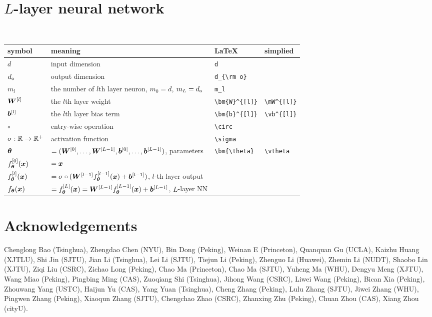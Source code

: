 \documentclass{article}
\begin{document}
\section{$L$-layer neural network}~\\
\begin{center}
    \begin{tabular}{llll}
        \toprule
        symbol & meaning & \LaTeX & simplied\\
        \midrule
        $d$ & input dimension & \verb!d! &  \\
        $d_{\rm o}$ & output dimension &\verb!d_{\rm o}! &  \\
        $m_l$& the number of $l$th layer neuron, $m_0=d$, $m_{L} = d_{\rm o}$&\verb!m_l!\\
        $\bm{W}^{[l]}$ & the $l$th layer weight &\verb!\bm{W}^{[l]}!&\verb!\mW^{[l]}!\\
        $\bm{b}^{[l]}$ & the $l$th layer bias term&\verb!\bm{b}^{[l]}!&\verb!\vb^{[l]}!\\
        $\circ$&entry-wise operation&\verb!\circ!\\
        $\sigma:\mathbb{R}\to\mathbb{R}^+$& activation function &\verb!\sigma!\\
        $\bm{\theta}$&$=(\bm{W}^{[0]},\ldots,\bm{W}^{[L-1]},\bm{b}^{[0]},\ldots,\bm{b}^{[L-1]})$,  parameters&\verb!\bm{\theta}!&\verb!\vtheta!\\
        $f_{\bm{\theta}}^{[0]}(\bm{x})$&$=\bm{x}$\\
        $f_{\bm{\theta}}^{[l]}(\bm{x})$&$=\sigma\circ(\bm{W}^{[l-1]} f_{\bm{\theta}}^{[l-1]}(\bm{x}) + \bm{b}^{[l-1]})$,  $l$-th  layer output \\
         $f_{\bm{\theta}}(\bm{x})$&$=f_{\bm{\theta}}^{[L]}(\bm{x})=\bm{W}^{[L-1]} f_{\bm{\theta}}^{[L-1]}(\bm{x}) + \bm{b}^{[L-1]}$,  $L$-layer NN\\
        \bottomrule
    \end{tabular}
\end{center}

\newpage
\section{Acknowledgements}
Chenglong Bao (Tsinghua), Zhengdao Chen (NYU), Bin Dong (Peking), Weinan E (Princeton),  Quanquan Gu (UCLA), Kaizhu Huang (XJTLU), Shi Jin (SJTU), Jian Li (Tsinghua), Lei Li (SJTU), Tiejun Li (Peking),   Zhenguo Li (Huawei), Zhemin Li (NUDT), Shaobo Lin (XJTU), Ziqi Liu (CSRC),  Zichao Long (Peking), Chao Ma (Princeton),  Chao Ma (SJTU), Yuheng Ma (WHU),    Dengyu Meng (XJTU), Wang Miao (Peking),  Pingbing Ming (CAS), Zuoqiang Shi (Tsinghua), Jihong Wang (CSRC), Liwei Wang (Peking), Bican Xia (Peking), Zhouwang Yang (USTC),  Haijun Yu (CAS),  Yang Yuan  (Tsinghua),  Cheng Zhang (Peking),  Lulu Zhang (SJTU), Jiwei Zhang  (WHU),   Pingwen Zhang (Peking), Xiaoqun Zhang (SJTU),  Chengchao Zhao (CSRC), Zhanxing Zhu (Peking), Chuan Zhou (CAS),  Xiang Zhou (cityU). 
\end{document}
